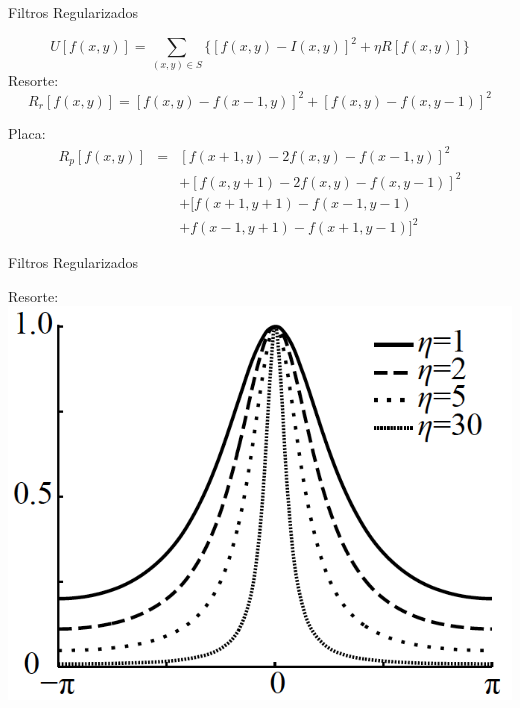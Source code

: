 \documentclass[]{beamer}
\begin{document}
\begin{frame}{Filtros Regularizados}
\begin{center}

\begin{equation}
  U[f(x,y)]= \sum_{(x,y) \in S} \Big\{  [ f(x,y)-I(x,y) ]^2 + \eta R[f(x,y)] \Big\} 
\end{equation}
Resorte:
\begin{equation}
  R_r [f(x,y)] = [f(x,y)-f(x-1,y)]^2 + [f(x,y)-f(x,y-1)]^2 
\end{equation}

Placa:
\begin{eqnarray}
  R_p [f(x,y)] & = & [f(x+1,y)-2f(x,y)-f(x-1,y)]^2 \nonumber \\
  & & + [f(x,y+1)-2f(x,y)-f(x,y-1)]^2 \nonumber \\
  & & + [ f(x+1,y+1)-f(x-1,y-1) \nonumber \\ 
  & & + f(x-1,y+1)-f(x+1,y-1) ]^2
\end{eqnarray}

\end{center}
\end{frame}
\begin{frame}{Filtros Regularizados}
\begin{center}

Resorte:\\
\includegraphics[scale=0.6]{Images/FrecuenciaResorte.png}

\end{center}
\end{frame}
\end{document}
